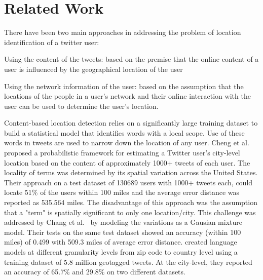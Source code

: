 \section{Related Work}
\label{sec:RelatedWork}
There have been two main approaches in addressing the problem of location identification of a twitter user: \begin{inparaenum}[(1)] 
\item Using the content of the tweets: based on the premise that the online content of a user is influenced by the geographical location of the user
\item Using the network information of the user: based on the assumption that the locations of the people in a user's network and their online interaction with the user can be used to determine the user's location.
\end{inparaenum}

Content-based location detection relies on a significantly large training dataset to build a statistical model that identifies words with a local scope. Use of these words in tweets are used to narrow down the location of any user. Cheng et al. \cite{cheng2010you} proposed a probabilistic framework for estimating a Twitter user's city-level location based on the content of approximately 1000+ tweets of each user. The locality of terms was determined by its spatial variation across the United States. Their approach on a test dataset of 130689 users with 1000+ tweets each, could locate 51\% of the users within 100 miles and the average error distance was reported as 535.564 miles. The disadvantage of this approach was the assumption that a "term" is spatially significant to only one location/city. This challenge was addressed by Chang et al.~\cite{chang2012phillies} by modeling the variations as a Gausian mixture model. Their tests on the same test dataset showed an accuracy (within 100 miles) of 0.499 with 509.3 miles of average error distance.
\cite{ferrara2012web} created language models at different granularity levels from zip code to country level using a training dataset of 5.8 million geotagged tweets. At the city-level, they reported an accuracy of 65.7\% and 29.8\% on two different datasets.

